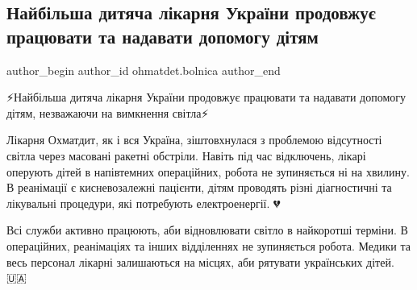  
 
 
 
 
 
\subsection{Найбільша дитяча лікарня України продовжує працювати та надавати допомогу дітям}
\label{sec:24_11_2022.fb.ohmatdet.bolnica.1.pracja}
 
\ifcmt
 author_begin
   author_id ohmatdet.bolnica
 author_end
\fi

⚡️Найбільша дитяча лікарня України продовжує працювати та надавати допомогу
дітям, незважаючи на вимкнення світла⚡️


Лікарня Охматдит, як і вся Україна, зіштовхнулася з проблемою відсутності
світла через масовані ракетні обстріли. Навіть під час відключень, лікарі
оперують дітей в напівтемних операційних, робота не зупиняється ні на хвилину.
В реанімації є кисневозалежні пацієнти, дітям проводять різні діагностичні та
лікувальні процедури, які потребують електроенергії. 💔


Всі служби активно працюють, аби відновлювати світло в найкоротші терміни. В
операційних, реанімаціях та інших відділеннях не зупиняється робота. Медики та
весь персонал лікарні залишаються на місцях, аби рятувати українських
дітей.🇺🇦


